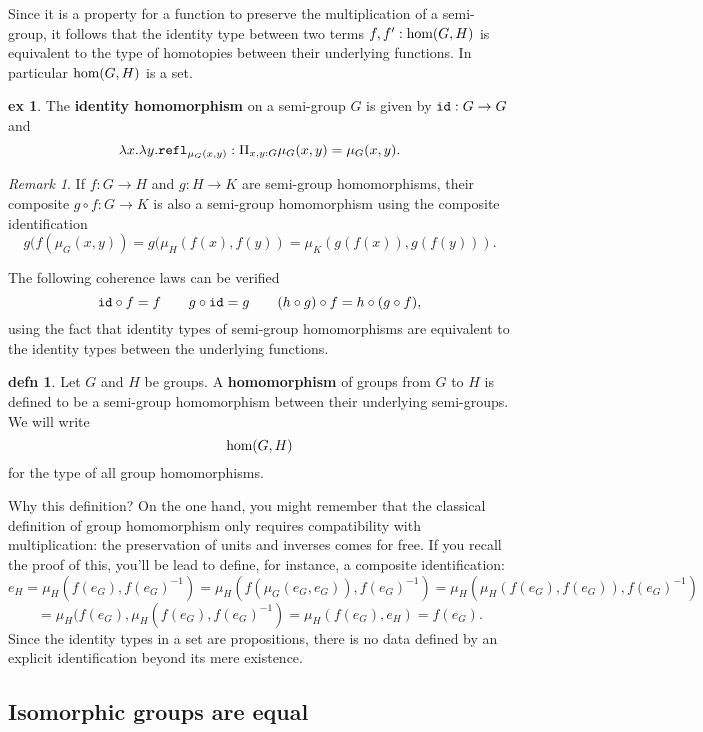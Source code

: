 \documentclass{amsart}
\theoremstyle{theorem}
\theoremstyle{definition}
\newtheorem*{defn}{defn}
\newtheorem*{ex}{ex}
\theoremstyle{remark}
\newtheorem*{rmk}{Remark}
\newcommand{\0}{\mathbbe{0}}
\newcommand{\1}{\mathbbe{1}}
\newcommand{\2}{\mathbbe{2}}
\newcommand{\3}{\mathbbe{3}}
\newcommand{\4}{\mathbbe{4}}
\newcommand{\term}[1]{{\textup{\texttt{#1}}}}
\newcommand{\type}[1]{{\textup{#1}}}
\newcommand{\id}{\term{id}}
\newcommand{\refl}{\term{refl}}
\begin{document}
Since it is a property for a function to preserve the multiplication of a semi-group, it follows that the identity type between two terms $f,f' :\type{hom}(G,H)$ is equivalent to the type of homotopies between their underlying functions. In particular $\type{hom}(G,H)$ is a set. 

\begin{ex} The \textbf{identity homomorphism} on a semi-group $G$ is given by $\id: G \to G$ and \[\lambda x.\lambda y. \refl_{\mu_G(x,y)} : \Pi_{x,y:G} \mu_G(x,y) = \mu_G(x,y).\]
\end{ex}

\begin{rmk} If $f \colon G \to H$ and $g \colon H \to K$ are semi-group homomorphisms, their composite $g \circ f \colon G \to K$ is also a semi-group homomorphism using the composite identification
\[ g(f(\mu_G(x,y)) = g(\mu_H(f(x),f(y)) = \mu_K(g(f(x)), g(f(y))).\]

The following coherence laws can be verified
\[ \id \circ f = f \qquad g \circ \id = g \qquad (h \circ g) \circ f = h \circ (g \circ f),\]
using the fact that identity types of semi-group homomorphisms are equivalent to the identity types between the underlying functions.
\end{rmk}

\begin{defn} Let $G$ and $H$ be groups. A \textbf{homomorphism} of groups from $G$ to $H$ is defined to be a semi-group homomorphism between their underlying semi-groups. We will write
\[ \type{hom}(G,H)\]
for the type of all group homomorphisms.
\end{defn}

Why this definition? On the one hand, you might remember that the classical definition of group homomorphism only requires compatibility with multiplication: the preservation of units and inverses comes for free. If you recall the proof of this, you'll be lead to define, for instance, a composite identification:
\[ e_H = \mu_H(f(e_G), f(e_G)^{-1}) = \mu_H(f(\mu_G(e_G,e_G)), f(e_G)^{-1}) = \mu_H(\mu_H(f(e_G),f(e_G)), f(e_G)^{-1}) \] \[ = \mu_H(f(e_G), \mu_H(f(e_G),f(e_G)^{-1}) = \mu_H(f(e_G), e_H) = f(e_G).\]
Since the identity types in a set are propositions, there is no data defined by an explicit identification beyond its mere existence. 
\subsection*{Isomorphic groups are equal}
\end{document}
